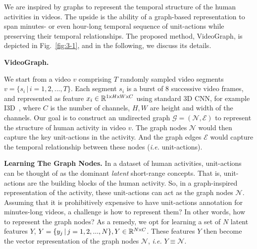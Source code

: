 \documentclass[10pt,twocolumn,letterpaper]{article}
\newcommand{\vbar}{\,|\,}
\newcommand{\partitle}[1]{\noindent\textbf{#1}}
\newcommand{\ptspace}{\vspace*{5pt}}
\begin{document}
We are inspired by graphs to represent the temporal structure of the human activities in videos.
The upside is the ability of a graph-based representation to span minutes- or even hour-long temporal sequence of unit-actions while preserving their temporal relationships.
The proposed method, VideoGraph, is depicted in Fig.~\ref{fig:3-1}, and in the following, we discuss its details.

\ptspace
\partitle{VideoGraph.}

We start from a video $v$ comprising $T$ randomly sampled video segments $v=\{s_i \vbar i = 1, 2, ..., T\}$.
Each segment $s_i$ is a burst of 8 successive video frames, and represented as feature $x_i \in \mathbb{R}^{1 {\mkern-2mu\times\mkern-2mu} H {\mkern-2mu\times\mkern-2mu} W {\mkern-2mu\times\mkern-2mu} C}$ using standard 3D CNN, for example I3D~\cite{carreira2017quo}, where $C$ is the number of channels, $H, W$ are height and width of the channels.
Our goal is to construct an undirected graph $\mathcal{G}= (\mathcal{N},\mathcal{E})$ to represent the structure of human activity in video $v$.
The graph nodes $\mathcal{N}$ would then capture the key unit-actions in the activity.
And the graph edges $\mathcal{E}$ would capture the temporal relationship between these nodes (\textit{i.e.}  unit-actions).

\ptspace
\partitle{Learning The Graph Nodes.}
In a dataset of human activities, unit-actions can be thought of as the dominant {\em latent} short-range concepts.
That is, unit-actions are the building blocks of the human activity.
So, in a graph-inspired representation of the activity, these unit-actions can act as the graph nodes $\mathcal{N}$.
Assuming that it is prohibitively expensive to have unit-actions annotation for minutes-long videos, a challenge is how to represent them?
In other words, how to represent the graph nodes?
As a remedy, we opt for learning a set of $N$ latent features $Y$, $Y=\{y_j \vbar j = 1, 2, ..., N\}, Y \in \mathbb{R}^{N \timesnarrow C}$.
These features $Y$ then become the vector representation of the graph nodes $\mathcal{N}$, \textit{i.e.} $Y \equiv \mathcal{N}$.
\end{document}
